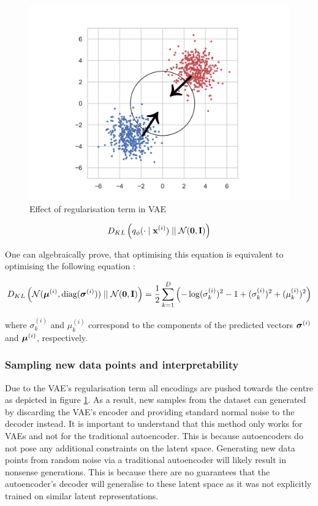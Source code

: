 	\begin{figure}
		\centering
		\includegraphics[width=0.7\linewidth]{two_gaussian_distributions}
		\caption{Effect of regularisation term in VAE}
		\label{fig:twogaussiandistributions}
	\end{figure}
	
	$$
	D_{KL} \left(  q_\phi (\cdot \mid \mathbf{x}^{(i)})  \mid \mid  \mathcal{N}(\bm{\mathbf{0}}, \mathbf{I})  \right)
	$$
	
	
	One can algebraically prove, that optimising this equation is equivalent to optimising the following equation \cite{kingmaAutoEncodingVariationalBayes2022}: 
	
	\begin{equation}	
		D_{KL} \left( \mathcal{N}(\bm{\mu}^{(i)}, \text{diag}(\bm{\sigma}^{(i)})) \mid \mid \mathcal{N}(\bm{\mathbf{0}}, \mathbf{I}) \right) = \frac{1}{2} \sum_{k=1}^{D} \left( -\log (\sigma_k^{(i)})^2 - 1 + (\sigma_k^{(i)})^2 + (\mu_k^{(i)})^2 \right)
	\end{equation}
	
	where $\sigma_k^{(i)}$ and $\mu_k^{(i)}$ correspond to the components of the predicted vectors $\bm{\sigma}^{(i)}$ and $\bm{\mu}^{(i)}$, respectively.
	
	


\subsubsection{Sampling new data points and interpretability}	
	Due to the VAE's regularisation term all encodings are pushed towards the centre as depicted in figure \ref{fig:twogaussiandistributions}. As a result, new samples from the dataset can generated by discarding the VAE's encoder and providing standard normal noise to the decoder instead. It is important to understand that this method only works for VAEs and not for the traditional autoencoder. This is because autoencoders do not pose any additional constraints on the latent space. Generating new data points from random noise via a traditional autoencoder will likely result in nonsense generations. This is because there are no guarantees that the autoencoder's decoder will generalise to these latent space as it was not explicitly trained on similar latent representations.
	

